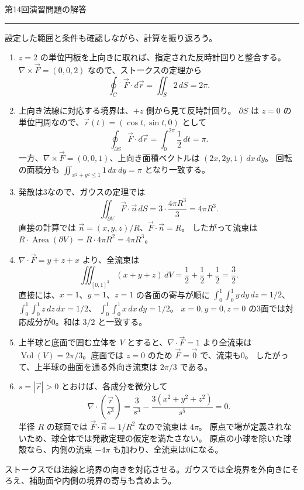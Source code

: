 \documentclass[a4paper,10pt,pdflatex,ja=standard,jafont=ipaex-type1,
  magstyle=real,scale=1]{bxjsarticle}
\newcommand{\handouttitle}[1]{%
  \begin{center}
    {\Large\color{ink}#1}\par\vspace{3mm}
    {\color{accent}\rule{0.88\linewidth}{0.7pt}}
  \end{center}\vspace{-2mm}}
\newcommand{\keybox}[1]{\par\vspace{3pt}\begingroup
  \setlength{\fboxsep}{4pt}%
  \colorbox{soft}{\parbox{\dimexpr\linewidth-2\fboxsep\relax}{\small #1}}%
  \endgroup\par\vspace{2pt}}
\newenvironment{problems}
  {\begin{enumerate}[leftmargin=2em,itemsep=3pt,topsep=3pt,parsep=0pt,
    font=\color{accent}]}
  {\end{enumerate}}
\begin{document}
\newpage
\handouttitle{第14回\quad 演習問題の解答}
{\small 設定した範囲と条件も確認しながら、計算を振り返ろう。}\par
\begin{problems}
\setlength{\itemsep}{7pt}
\item $z=2$ の単位円板を上向きに取れば、指定された反時計回りと整合する。
$\nabla\times\vec F=(0,0,2)$ なので、ストークスの定理から
$$
 \oint_C\vec F\cdot d\vec r=\iint_S2\,dS=2\pi.
$$

\item 上向き法線に対応する境界は、$+z$ 側から見て反時計回り。
$\partial S$ は $z=0$ の単位円周なので、$\vec r(t)=(\cos t,\sin t,0)$ として
$$
 \oint_{\partial S}\vec F\cdot d\vec r=\int_0^{2\pi}\frac12\,dt=\pi.
$$
一方、$\nabla\times\vec F=(0,0,1)$、上向き面積ベクトルは $(2x,2y,1)\,dx\,dy$。
回転の面積分も $\iint_{x^2+y^2\le1}1\,dx\,dy=\pi$ となり一致する。

\item 発散は3なので、ガウスの定理では
$$
 \iint_{\partial V}\vec F\cdot\vec n\,dS
 =3\cdot\frac{4\pi R^3}{3}=4\pi R^3.
$$
直接の計算では $\vec n=(x,y,z)/R$、$\vec F\cdot\vec n=R$。
したがって流束は $R\cdot\operatorname{Area}(\partial V)=R\cdot4\pi R^2=4\pi R^3$。

\item $\nabla\cdot\vec F=y+z+x$ より、全流束は
$$
 \iiint_{[0,1]^3}(x+y+z)\,dV=\frac12+\frac12+\frac12=\frac32.
$$
直接には、$x=1$、$y=1$、$z=1$ の各面の寄与が順に
$\int_0^1\int_0^1y\,dy\,dz=1/2$、$\int_0^1\int_0^1z\,dz\,dx=1/2$、
$\int_0^1\int_0^1x\,dx\,dy=1/2$。
$x=0,y=0,z=0$ の3面では対応成分が0。和は $3/2$ と一致する。

\item 上半球と底面で囲む立体を $V$ とすると、$\nabla\cdot\vec F=1$ より全流束は
$\operatorname{Vol}(V)=2\pi/3$。底面では $z=0$ のため $\vec F=\vec0$ で、流束も0。
したがって、上半球の曲面を通る外向き流束は $2\pi/3$ である。

\item $s=|\vec r|>0$ とおけば、各成分を微分して
$$
 \nabla\cdot\left(\frac{\vec r}{s^3}\right)
 =\frac3{s^3}-\frac{3(x^2+y^2+z^2)}{s^5}=0.
$$
半径 $R$ の球面では $\vec F\cdot\vec n=1/R^2$ なので流束は $4\pi$。
原点で場が定義されないため、球全体では発散定理の仮定を満たさない。
原点の小球を除いた球殻なら、内側の流束 $-4\pi$ も加わり、全流束は0になる。
\end{problems}
\keybox{ストークスでは法線と境界の向きを対応させる。ガウスでは全境界を外向きにそろえ、補助面や内側の境界の寄与も含めよう。}
\end{document}
